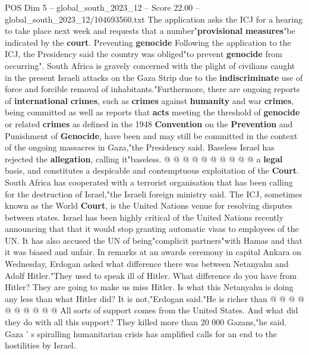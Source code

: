 \begin{textsample}{POS Dim 5 – global\_south\_2023\_12 – Score 22.00 – global\_south\_2023\_12/104693560.txt}
The application asks the ICJ for a hearing to take place next week and requests that a number"\textbf{provisional} \textbf{measures}"be indicated by the \textbf{court}.
Preventing \textbf{genocide} Following the application to the ICJ, the Presidency said the country was obliged"to prevent \textbf{genocide} from occurring".
South Africa is gravely concerned with the plight of civilians caught in the present Israeli attacks on the Gaza Strip due to the \textbf{indiscriminate} use of force and forcible removal of inhabitants."Furthermore, there are ongoing reports of \textbf{international} \textbf{crimes}, such as \textbf{crimes} against \textbf{humanity} and war \textbf{crimes}, being committed as well as reports that \textbf{acts} meeting the threshold of \textbf{genocide} or related \textbf{crimes} as defined in the 1948 \textbf{Convention} on the \textbf{Prevention} and Punishment of \textbf{Genocide}, have been and may still be committed in the context of the ongoing massacres in Gaza,"the Presidency said.
Baseless Israel has rejected the \textbf{allegation}, calling it"baseless. @ @ @ @ @ @ @ @ @ @ a \textbf{legal} basis, and constitutes a despicable and contemptuous exploitation of the \textbf{Court}.
South Africa has cooperated with a terrorist organisation that has been calling for the destruction of Israel,"the Israeli foreign ministry said.
The ICJ, sometimes known as the World \textbf{Court}, is the United Nations venue for resolving disputes between states.
Israel has been highly critical of the United Nations recently announcing that that it would stop granting automatic visas to employees of the UN.
It has also accused the UN of being"complicit partners"with Hamas and that it was biased and unfair.
In remarks at an awards ceremony in capital Ankara on Wednesday, Erdogan asked what difference there was between Netanyahu and Adolf Hitler."They used to speak ill of Hitler.
What difference do you have from Hitler?
They are going to make us miss Hitler.
Is what this Netanyahu is doing any less than what Hitler did?
It is not,"Erdogan said."He is richer than @ @ @ @ @ @ @ @ @ @ All sorts of support comes from the United States.
And what did they do with all this support?
They killed more than 20 000 Gazans,"he said.
Gaza ' s spiralling humanitarian crisis has amplified calls for an end to the hostilities by Israel.

\end{textsample}
